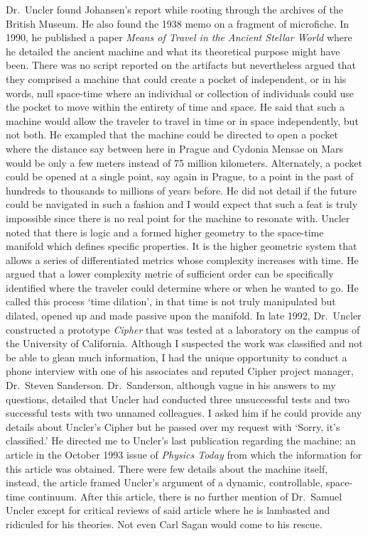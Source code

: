 \documentclass[
]{article}
\begin{document}
Dr.~Uncler found Johansen's report while rooting through the archives of
the British Museum. He also found the 1938 memo on a fragment of
microfiche. In 1990, he published a paper \emph{Means of Travel in the
Ancient Stellar World} where he detailed the ancient machine and what
its theoretical purpose might have been. There was no script reported on
the artifacts but nevertheless argued that they comprised a machine that
could create a pocket of independent, or in his words, null space-time
where an individual or collection of individuals could use the pocket to
move within the entirety of time and space. He said that such a machine
would allow the traveler to travel in time or in space independently,
but not both. He exampled that the machine could be directed to open a
pocket where the distance say between here in Prague and Cydonia Mensae
on Mars would be only a few meters instead of 75 million kilometers.
Alternately, a pocket could be opened at a single point, say again in
Prague, to a point in the past of hundreds to thousands to millions of
years before. He did not detail if the future could be navigated in such
a fashion and I would expect that such a feat is truly impossible since
there is no real point for the machine to resonate with. Uncler noted
that there is logic and a formed higher geometry to the space-time
manifold which defines specific properties. It is the higher geometric
system that allows a series of differentiated metrics whose complexity
increases with time. He argued that a lower complexity metric of
sufficient order can be specifically identified where the traveler could
determine where or when he wanted to go. He called this process `time
dilation', in that time is not truly manipulated but dilated, opened up
and made passive upon the manifold. In late 1992, Dr.~Uncler constructed
a prototype \emph{Cipher} that was tested at a laboratory on the campus
of the University of California. Although I suspected the work was
classified and not be able to glean much information, I had the unique
opportunity to conduct a phone interview with one of his associates and
reputed Cipher project manager, Dr.~Steven Sanderson. Dr.~Sanderson,
although vague in his answers to my questions, detailed that Uncler had
conducted three unsuccessful tests and two successful tests with two
unnamed colleagues. I asked him if he could provide any details about
Uncler's Cipher but he passed over my request with `Sorry, it's
classified.' He directed me to Uncler's last publication regarding the
machine; an article in the October 1993 issue of \emph{Physics Today}
from which the information for this article was obtained. There were few
details about the machine itself, instead, the article framed Uncler's
argument of a dynamic, controllable, space-time continuum. After this
article, there is no further mention of Dr.~Samuel Uncler except for
critical reviews of said article where he is lambasted and ridiculed for
his theories. Not even Carl Sagan would come to his rescue.
\end{document}
